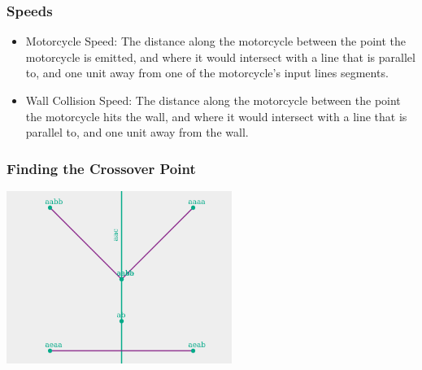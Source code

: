 \documentclass[hyperref={pdfpagemode=FullScreen},aspectratio=169]{beamer}
\begin{document}
\begin{frame}
  \frametitle{Speeds}
  \begin{itemize}
  \item Motorcycle Speed: The distance along the motorcycle between the point the motorcycle is emitted, and where it would intersect with a line that is parallel to, and one unit away from one of the motorcycle's input lines segments.
  \item Wall Collision Speed: The distance along the motorcycle between the point the motorcycle hits the wall, and where it would intersect with a line that is parallel to, and one unit away from the wall.
  \end{itemize}
\end{frame}

\begin{frame}
  \frametitle{Finding the Crossover Point}
  \includegraphics[width=0.55\textwidth, center]{C3-motorcycle-point-nogrid.png}
\end{frame}
\end{document}
